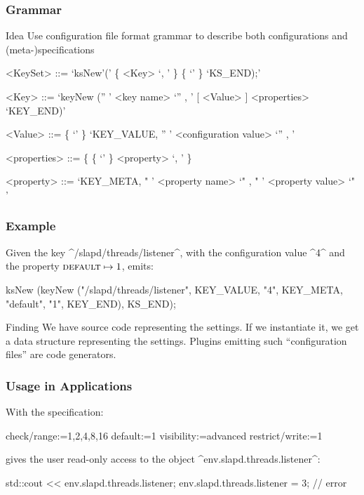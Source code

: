 \begin{frame}[fragile]
	\frametitle{Grammar}
	\begin{alertblock}{Idea}
	Use configuration file format grammar to describe both configurations and (meta-)specifications
	\end{alertblock}

	\begin{grammar}
	<KeySet> ::= \lq ksNew'\WhiteSpace(' \{ <Key> \lq , \LineBreak'  \}  \{ \lq\WhiteSpace' \} \lq KS\_END);'

	<Key> ::= \lq keyNew \WhiteSpace ('' ' <key name> \lq ''  , \LineBreak' [ <Value> ] <properties> \lq KEY_END)'

	<Value> ::=  \{ \lq\WhiteSpace' \} \lq KEY\_VALUE, \WhiteSpace '' ' <configuration value> \lq ''  , \LineBreak'

	<properties> ::= \{ \{ \lq\WhiteSpace' \} <property> \lq , \LineBreak' \}

	<property> ::=  \lq KEY\_META, \WhiteSpace " ' <property name> \lq "  , \WhiteSpace " ' <property value> \lq " '
	\end{grammar}
\end{frame}

\begin{frame}[fragile]
	\frametitle{Example}
	\begin{example}
	Given the key ^/slapd/threads/listener^, with the configuration value ^4^ and the property ${\textsc{default}} \mapsto 1$, \elektra{} emits:

	\begin{code}[gobble=4,language=Cpp]
	ksNew (keyNew ("/slapd/threads/listener",
		       KEY_VALUE, "4",
		       KEY_META, "default", "1",
		       KEY_END),
	       KS_END);
	\end{code}
	\vspace{-1em}
	\end{example}

	\pause
	\begin{alertblock}{Finding}
	We have source code representing the settings.
	If we instantiate it, we get a data structure representing the settings.
	Plugins emitting such ``configuration files'' are code generators.
	\end{alertblock}
\end{frame}

\begin{frame}[fragile]
	\frametitle{Usage in Applications}

	With the specification:
	\par
	\begin{code}
	  check/range:=1,2,4,8,16
	  default:=1
	  visibility:=advanced
	  restrict/write:=1
	\end{code}
	\par
	 gives the user read-only access to the object ^env.slapd.threads.listener^:
	\par
	\begin{code}[language=Cpp]
	std::cout << env.slapd.threads.listener;
	env.slapd.threads.listener = 3; // error
	\end{code}
	\par
\end{frame}

